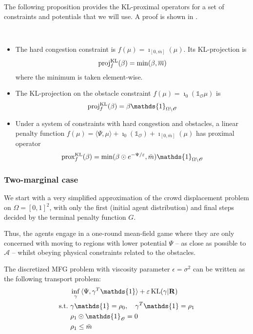\documentclass[../report.tex]{subfiles}
\begin{document}
The following proposition provides the KL-proximal operators for a set of constraints and potentials that we will use. A proof is shown in \textcite{peyr2015entropic}.
\begin{prop}\label{prop:KLproxExamples}~
\begin{itemize}
	\item The hard congestion constraint is $f(\mu) = \imath_{[0,\overline{m}]}(\mu)$. Its KL-projection is
	\begin{equation}
	\operatorname{proj}^{\operatorname{KL}}_f(\beta) = \min(\beta,\overline{m})
	\end{equation}
	where the minimum is taken element-wise.
	\item The KL-projection on the obstacle constraint $f(\mu) = \imath_{0} (\mathds{1}_\mathscr{O}\mu)$ is
	\begin{equation}
	\proj^{\KL}_f (\beta) = \beta \mathds{1}_{\Omega\backslash\mathscr{O}}
	\end{equation}
	\item Under a system of constraints with hard congestion and obstacles, a linear penalty function $f(\mu) = \langle\Psi, \mu\rangle + \imath_0(\mathds{1}_\mathscr{O}) + \imath_{[0,\bar{m}]}(\mu)$ has proximal operator
	\begin{equation}
	\prox^{\KL}_{f}(\beta) =
	\min(\beta\odot e^{-\Psi/\epsilon}, \bar{m}) \mathds{1}_{\Omega\backslash\mathscr{O}}
	\end{equation}
\end{itemize}
\end{prop}


\subsubsection{Two-marginal case}

We start with a very simplified approximation of the crowd displacement problem on $\Omega = [0, 1]^2$, with only the first (initial agent distribution) and final steps decided by the terminal penalty function $G$. 

Thus, the agents engage in a one-round mean-field game where they are only concerned with moving to regions with lower potential $\Psi$ -- as close as possible to $\mathscr{A}$ -- whilst obeying physical constraints related to the obstacles.

The discretized MFG problem with viscosity parameter $\epsilon = \sigma^2$ can be written as the following transport problem:
\begin{equation}\label{eq:2MargFuzzyObstacleObj}
\begin{aligned}
	&\inf_\gamma{} \langle \Psi, \gamma^T\mathds{1}\rangle + \epsilon \KL(\gamma | \bfR) \\
	\suchthat\ & \gamma\mathds{1} = \rho_0, \quad \gamma^T\mathds{1} = \rho_1  \\
	& \rho_1\odot \mathds{1}_{\mathscr{O}} = 0  \\
	& \rho_1 \leq \bar{m}
	\end{aligned}
\end{equation}
\end{document}
